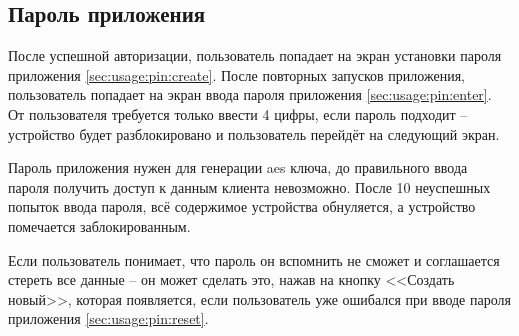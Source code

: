 \subsection{Пароль приложения}
\label{sec:usage:pin}

После успешной авторизации, пользователь попадает на экран установки пароля приложения \ref{sec:usage:pin:create}. После повторных запусков приложения, пользователь попадает на экран ввода пароля приложения \ref{sec:usage:pin:enter}. От пользователя требуется только ввести 4 цифры, если пароль подходит -- устройство будет разблокировано и пользователь перейдёт на следующий экран.

Пароль приложения нужен для генерации \gls{aes} ключа, до правильного ввода пароля получить доступ к данным клиента невозможно. После 10 неуспешных попыток ввода пароля, всё содержимое устройства обнуляется, а устройство помечается заблокированным.

Если пользователь понимает, что пароль он вспомнить не сможет и соглашается стереть все данные -- он может сделать это, нажав на кнопку <<Создать новый>>, которая появляется, если пользователь уже ошибался при вводе пароля приложения \ref{sec:usage:pin:reset}.

